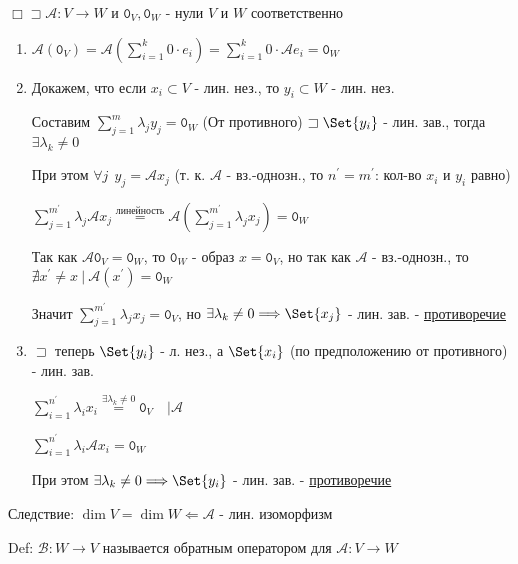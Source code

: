 \documentclass[12pt]{article}
\begin{document}
    $\Box \sqsupset \mathcal{A} : V \rightarrow W$ и $\texttt{0}_V, \texttt{0}_W$ - нули $V$ и $W$ соответственно
    \begin{enumerate}
        \item $\mathcal{A}(\texttt{0}_V) = \mathcal{A}(\sum^k_{i=1} 0 \cdot e_i) = \sum^k_{i=1} 0 \cdot \mathcal{A}e_i = \texttt{0}_W$

        \item Докажем, что если ${x_i} \subset V$ - лин. нез., то ${y_i} \subset W$ - лин. нез.

        Составим $\sum^m_{j=1} \lambda_j y_j = \texttt{0}_W$ (От противного) $\sqsupset \Set{y_i}$ - лин. зав., тогда $\exists \lambda_k \neq 0$

        При этом $\forall j \ \ y_j = \mathcal{A}x_j$ (т. к. $\mathcal{A}$ - вз.-однозн., то $n^\prime = m^\prime$: кол-во $x_i$ и $y_i$ равно)

        $\sum^{m^\prime}_{j=1} \lambda_j \mathcal{A}x_j \stackrel{\text{линейность}}{=} \mathcal{A} (\sum^{m^\prime}_{j=1} \lambda_j x_j) = \texttt{0}_W$

        Так как $\mathcal{A}\texttt{0}_V = \texttt{0}_W$, то $\texttt{0}_W$ - образ $x = \texttt{0}_V$, но так как $\mathcal{A}$ - вз.-однозн., то
        $\nexists x^\prime \neq x \ | \ \mathcal{A}(x^\prime) = \texttt{0}_W$

        Значит $\sum^{m^\prime}_{j=1} \lambda_j x_j = \texttt{0}_V$, но $\exists \lambda_k \neq 0 \Longrightarrow \Set{x_j}$ - лин. зав. - \underline{противоречие}

        \item $\sqsupset$ теперь $\Set{y_i}$ - л. нез., а $\Set{x_i}$ (по предположению от противного) - лин. зав.

        $\sum^{n^\prime}_{i = 1} \lambda_i x_i \stackrel{\exists \lambda_k \neq 0}{=} \texttt{0}_V \quad \Big| \mathcal{A}$

        $\sum^{n^\prime}_{i = 1} \lambda_i \mathcal{A}x_i = \texttt{0}_W$

        При этом $\exists \lambda_k \neq 0 \Longrightarrow \Set{y_i}$ - лин. зав. - \underline{противоречие}

    \end{enumerate}

    Следствие: $\dim V = \dim W \Longleftarrow \mathcal{A}$ - лин. изоморфизм

    \hypertarget{reverselinearoperator}{}

    Def: $\mathcal{B} : W \rightarrow V$ называется обратным оператором для $\mathcal{A} : V \rightarrow W$
\end{document}
